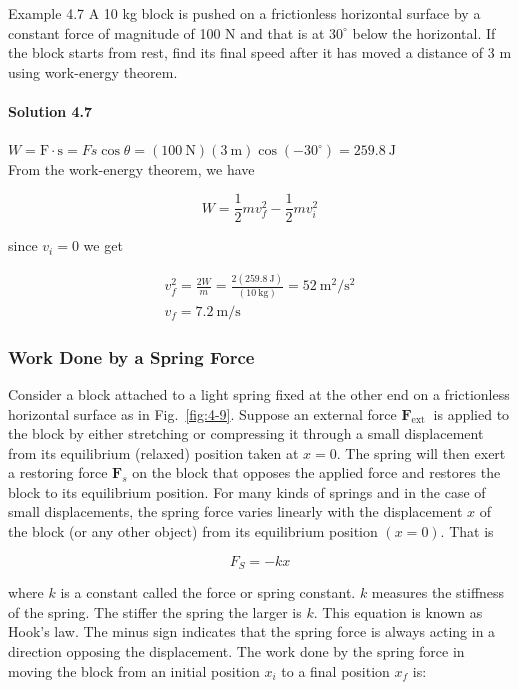 \documentclass[10pt]{article}
\numberwithin{equation}{section}
\begin{document}
Example 4.7 A 10 kg block is pushed on a frictionless horizontal surface by a constant force of magnitude of 100 N and that is at $30^{\circ}$ below the horizontal. If the block starts from rest, find its final speed after it has moved a distance of 3 m using work-energy theorem.

\paragraph*{Solution 4.7}
$W=\mathrm{F} \cdot \mathrm{s}=F s \cos \theta=(100 \mathrm{~N})(3 \mathrm{~m}) \cos \left(-30^{\circ}\right)=259.8 \mathrm{~J}$\\
From the work-energy theorem, we have

$$
W=\frac{1}{2} m v_{f}^{2}-\frac{1}{2} m v_{i}^{2}
$$

since $v_{i}=0$ we get

$$
\begin{gathered}
v_{f}^{2}=\frac{2 W}{m}=\frac{2(259.8 \mathrm{~J})}{(10 \mathrm{~kg})}=52 \mathrm{~m}^{2} / \mathrm{s}^{2} \\
v_{f}=7.2 \mathrm{~m} / \mathrm{s}
\end{gathered}
$$

\subsubsection{Work Done by a Spring Force}\label{sec:4-3-1}
Consider a block attached to a light spring fixed at the other end on a frictionless horizontal surface as in Fig.~\ref{fig:4-9}. Suppose an external force $\mathbf{F}_{\text {ext }}$ is applied to the block by either stretching or compressing it through a small displacement from its equilibrium (relaxed) position taken at $x=0$. The spring will then exert a restoring force $\mathbf{F}_{s}$ on the block that opposes the applied force and restores the block to its equilibrium position. For many kinds of springs and in the case of small displacements, the spring force varies linearly with the displacement $x$ of the block (or any other object) from its equilibrium position $(x=0)$. That is

$$
F_{S}=-k x
$$

where $k$ is a constant called the force or spring constant. $k$ measures the stiffness of the spring. The stiffer the spring the larger is $k$. This equation is known as Hook's law. The minus sign indicates that the spring force is always acting in a direction opposing the displacement. The work done by the spring force in moving the block from an initial position $x_{i}$ to a final position $x_{f}$ is:
\end{document}
